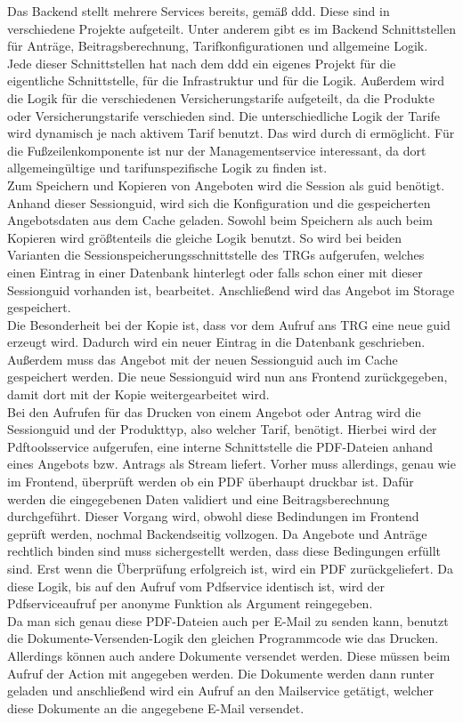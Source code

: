 Das Backend stellt mehrere Services bereits, gemäß \gls{ddd}. Diese sind in verschiedene Projekte aufgeteilt. Unter anderem gibt es im Backend Schnittstellen für Anträge, Beitragsberechnung, Tarifkonfigurationen und allgemeine Logik. Jede dieser Schnittstellen hat nach dem \gls{ddd} ein eigenes Projekt für die eigentliche Schnittstelle, für die Infrastruktur und für die Logik. Außerdem wird die Logik für die verschiedenen Versicherungstarife aufgeteilt, da die Produkte oder Versicherungstarife verschieden sind. Die unterschiedliche Logik der Tarife wird dynamisch je nach aktivem Tarif benutzt. Das wird durch \gls{di} ermöglicht. Für die Fußzeilenkomponente ist nur der Managementservice interessant, da dort allgemeingültige und tarifunspezifische Logik zu finden ist.\\

Zum Speichern und Kopieren von Angeboten wird die Session als \ac{guid} benötigt. Anhand dieser Sessionguid, wird sich die Konfiguration und die gespeicherten Angebotsdaten aus dem Cache geladen. Sowohl beim Speichern als auch beim Kopieren wird größtenteils die gleiche Logik benutzt. So wird bei beiden Varianten die Sessionspeicherungsschnittstelle des \ac{TRG}s aufgerufen, welches einen Eintrag in einer Datenbank hinterlegt oder falls schon einer mit dieser Sessionguid vorhanden ist, bearbeitet. Anschließend wird das Angebot im Storage
 gespeichert. \\ Die Besonderheit bei der Kopie ist, dass vor dem Aufruf ans \ac{TRG} eine neue \ac{guid} erzeugt wird. Dadurch wird ein neuer Eintrag in die Datenbank geschrieben. Außerdem muss das Angebot mit der neuen Sessionguid auch im Cache gespeichert werden. Die neue Sessionguid wird nun ans Frontend zurückgegeben, damit dort mit der Kopie weitergearbeitet wird.\\
Bei den Aufrufen für das Drucken von einem Angebot oder Antrag wird die Sessionguid und der Produkttyp, also welcher Tarif, benötigt. Hierbei wird der Pdftoolsservice aufgerufen, eine interne Schnittstelle die PDF-Dateien anhand eines Angebots bzw. Antrags als Stream liefert. Vorher muss allerdings, genau wie im Frontend, überprüft werden ob ein PDF überhaupt druckbar ist. Dafür werden die eingegebenen Daten validiert und eine Beitragsberechnung durchgeführt. Dieser Vorgang wird, obwohl diese Bedindungen im Frontend geprüft werden, nochmal Backendseitig vollzogen. Da Angebote und Anträge rechtlich binden sind muss sichergestellt werden, dass diese Bedingungen erfüllt sind. Erst wenn die Überprüfung erfolgreich ist, wird ein PDF zurückgeliefert. Da diese Logik, bis auf den Aufruf vom Pdfservice identisch ist, wird der Pdfserviceaufruf per anonyme Funktion als Argument reingegeben.\\
Da man sich genau diese PDF-Dateien auch per E-Mail zu senden kann, benutzt die Dokumente-Versenden-Logik den gleichen Programmcode wie das Drucken. Allerdings können auch andere Dokumente versendet werden. Diese müssen beim Aufruf der Action mit angegeben werden. Die Dokumente werden dann runter geladen und anschließend wird ein Aufruf an den Mailservice getätigt, welcher diese Dokumente an die angegebene E-Mail versendet.

